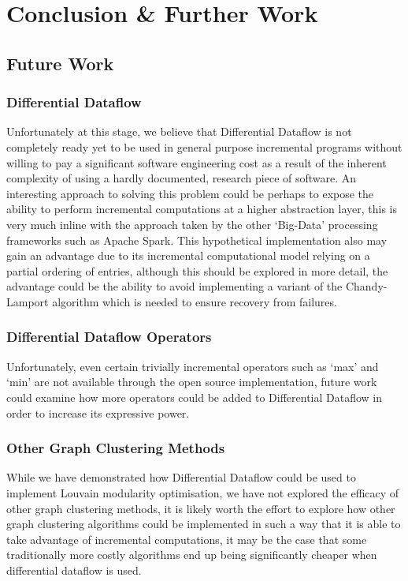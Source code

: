 \chapter{Conclusion \& Further Work}

\section{Future Work}
\subsection{Differential Dataflow}
Unfortunately at this stage, we believe that Differential Dataflow is not completely ready yet to be used in general purpose incremental programs without willing to pay a significant software engineering cost as a result of the inherent complexity of using a hardly documented, research piece of software. An interesting approach to solving this problem could be perhaps to expose the ability to perform incremental computations at a higher abstraction layer, this is very much inline with the approach taken by the other `Big-Data' processing frameworks such as Apache Spark. This hypothetical implementation also may gain an advantage due to its incremental computational model relying on a partial ordering of entries, although this should be explored in more detail, the advantage could be the ability to avoid implementing a variant of the Chandy-Lamport algorithm which is needed to ensure recovery from failures. 

\subsection{Differential Dataflow Operators}
Unfortunately, even certain trivially incremental operators such as `max' and `min' are not available through the open source implementation, future work could examine how more operators could be added to Differential Dataflow in order to increase its expressive power. 

\subsection{Other Graph Clustering Methods}
While we have demonstrated how Differential Dataflow could be used to implement Louvain modularity optimisation, we have not explored the efficacy of other graph clustering methods, it is likely worth the effort to explore how other graph clustering algorithms could be implemented in such a way that it is able to take advantage of incremental computations, it may be the case that some traditionally more costly algorithms end up being significantly cheaper when differential dataflow is used. 

